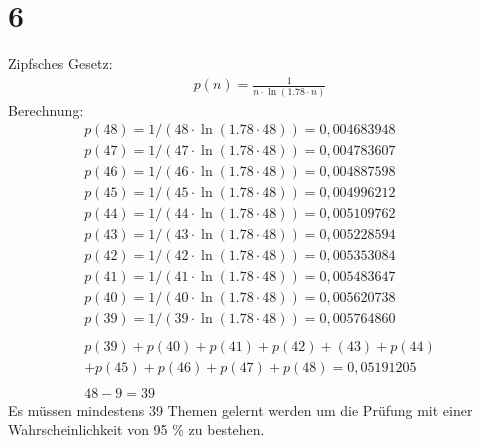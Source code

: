 \documentclass[ngerman]{scrartcl}
\begin{document}
\section*{6}
	Zipfsches Gesetz:
	\begin{align*}
		p(n) = \frac{1}{n \cdot \ln(1.78 \cdot n) }
	\end{align*}
	Berechnung:
	\begin{align*}
		p(48) = 1/(48 \cdot \ln(1.78 \cdot 48)) = 0,004683948 \\
		p(47) = 1/(47 \cdot \ln(1.78 \cdot 48)) = 0,004783607 \\
		p(46) = 1/(46 \cdot \ln(1.78 \cdot 48)) = 0,004887598 \\
		p(45) = 1/(45 \cdot \ln(1.78 \cdot 48)) = 0,004996212 \\
		p(44) = 1/(44 \cdot \ln(1.78 \cdot 48)) = 0,005109762 \\
		p(43) = 1/(43 \cdot \ln(1.78 \cdot 48)) = 0,005228594 \\
		p(42) = 1/(42 \cdot \ln(1.78 \cdot 48)) = 0,005353084 \\
		p(41) = 1/(41 \cdot \ln(1.78 \cdot 48)) = 0,005483647 \\
		p(40) = 1/(40 \cdot \ln(1.78 \cdot 48)) = 0,005620738 \\
		p(39) = 1/(39 \cdot \ln(1.78 \cdot 48)) = 0,005764860  \\
		\\
		p(39)+p(40)+p(41)+p(42)+(43)+p(44) \\
		+p(45)+p(46)+p(47)+p(48) = 0,05191205 \\
		\\
		48 - 9 = 39	
	\end{align*}
	Es müssen mindestens 39 Themen gelernt werden um die Prüfung mit einer Wahrscheinlichkeit von 95 \% zu bestehen.
\end{document}
